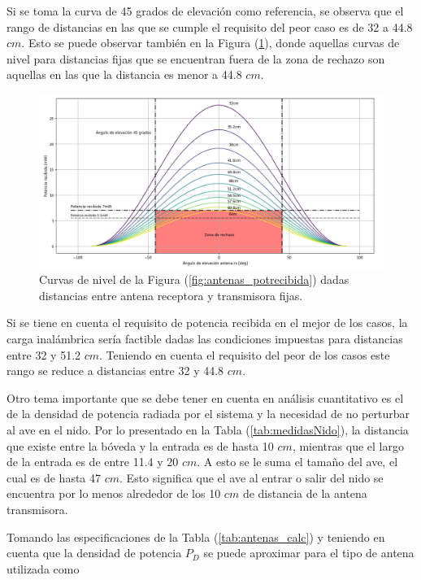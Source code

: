 Si se toma la curva de 45 grados de elevación como referencia, se observa que el rango de distancias en las que se cumple el requisito del peor caso es de 32 a 44.8 $cm$. Esto se puede observar también en la Figura (\ref{fig:antenas_curva_elevacion}), donde aquellas curvas de nivel para distancias fijas que se encuentran fuera de la zona de rechazo son aquellas en las que la distancia es menor a 44.8 $cm$.

\begin{figure}[H]
	\centering
	\includegraphics[width=\linewidth]{ImagenesFactibilidad/antenas_curva_elevacion}
	\caption{Curvas de nivel de la Figura (\ref{fig:antenas_potrecibida}) dadas distancias entre antena receptora y transmisora fijas.}
	\label{fig:antenas_curva_elevacion}
\end{figure}

Si se tiene en cuenta el requisito de potencia recibida en el mejor de los casos, la carga inalámbrica sería factible dadas las condiciones impuestas para distancias entre 32 y 51.2 $cm$. Teniendo en cuenta el requisito del peor de los casos este rango se reduce a distancias entre 32 y 44.8 $cm$.

Otro tema importante que se debe tener en cuenta en análisis cuantitativo es el de la densidad de potencia radiada por el sistema y la necesidad de no perturbar al ave en el nido. Por lo presentado en la Tabla (\ref{tab:medidasNido}), la distancia que existe entre la bóveda y la entrada es de hasta 10 $cm$, mientras que el largo de la entrada es de entre 11.4 y 20 $cm$. A esto se le suma el tamaño del ave, el cual es de hasta 47 $cm$. Esto significa que el ave al entrar o salir del nido se encuentra por lo menos alrededor de los 10 $cm$ de distancia de la antena transmisora.

Tomando las especificaciones de la Tabla (\ref{tab:antenas_calc}) y teniendo en cuenta que la densidad de potencia $P_D$ se puede aproximar para el tipo de antena utilizada como

